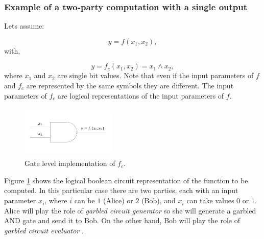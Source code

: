 \begin{refsection}
\subsubsection{Example of a two-party computation with a single output}

Lets assume:

\begin{equation}\label{eq:f_to_be_computed}
  y=f(x_1,x_2),
\end{equation}
with,

\begin{equation}\label{eq:fc_to_be_computed}
  y=f_c(x_1, x_2) = x_1 \wedge x_2,
\end{equation}
where $x_1$ and $x_2$ are single bit values. Note that even if the input parameters of $f$ and $f_c$ are represented by the same symbols they are different. The input parameters of $f_c$ are logical representations of the input parameters of $f$.

\begin{figure}[H]
	\centering
	\includegraphics[width=0.4\textwidth, height=2.5cm]{./sdf/secure_multiparty_computation/figures/Gate.png}
    \caption{Gate level implementation of $f_c$.}\label{fig:andGate}
\end{figure}

Figure \ref{fig:andGate} shows the logical boolean circuit representation of the function to be computed. In this particular case there are two parties, each with an input parameter $x_i$, where $i$ can be $1$ (Alice) or $2$ (Bob), and $x_i$ can take values $0$ or $1$. Alice will play the role of \textit{garbled circuit generator} so she will generate a garbled AND gate and send it to Bob. On the other hand, Bob will play the role of \textit{garbled circuit evaluator} \cite{Yakoubov}.


\end{refsection}

